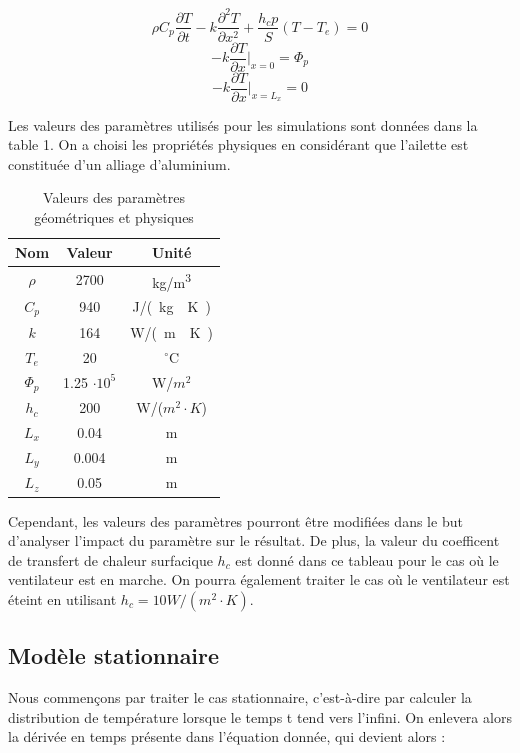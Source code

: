 \documentclass[12pt,a4paper]{article}
\begin{document}
	$$\rho C_p \frac{\partial T}{\partial t} - k \frac{\partial^2 T}{\partial x^2} + \frac{h_c p}{S} (T - T_e) = 0$$
	$$-k \frac{\partial T}{\partial x} \bigg|_{x=0} = \Phi_p$$
	$$ -k \frac{\partial T}{\partial x} \bigg|_{x=L_x} = 0$$

	Les valeurs des paramètres utilisés pour les simulations sont données dans la table 1.
	On a choisi les propriétés physiques en considérant que l'ailette est constituée d'un alliage d'aluminium. \\

	\begin{table}[h]
		\centering
		\begin{tabular}{|c|c|c|}
			\hline
			Nom & Valeur & Unité \\
			\hline
			$\rho$ & 2700 & \si{kg/m^3} \\
			\hline
			$C_p$ & 940 & \si{J/(kg\cdot K)} \\
			\hline
			$k$ & 164 & \si{W/(m\cdot K)} \\
			\hline
			$T_e$ & 20 & $^{\circ}$C \\
			\hline
			$\Phi_p$ & 1.25 $\cdot 10^5$ & W/$m^2$ \\
			\hline
			$h_c$ & 200 & W/($m^2 \cdot K$) \\
			\hline
			$L_x$ & 0.04 & m \\
			\hline
			$L_y$ & 0.004 & m \\
			\hline
			$L_z$ & 0.05 & m \\
			\hline
		\end{tabular}
		\caption{Valeurs des paramètres géométriques et physiques}
		\label{table:exemple}
	  \end{table}

	Cependant, les valeurs des paramètres pourront être modifiées dans le but d'analyser l'impact du paramètre sur le résultat.
	De plus, la valeur du coefficent de transfert de chaleur surfacique $h_c$ est donné dans ce tableau pour le cas où le ventilateur est en marche.
	On pourra également traiter le cas où le ventilateur est éteint en utilisant $h_c = 10 W/(m^2 \cdot K)$. \\

	\subsection{Modèle stationnaire}

	Nous commençons par traiter le cas stationnaire, c'est-à-dire par calculer la distribution de température lorsque le temps t tend vers l'infini.
	On enlevera alors la dérivée en temps présente dans l'équation donnée, qui devient alors :
	
\end{document}
